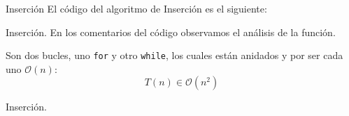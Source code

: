 \documentclass[10pt, xcolor=table]{beamer}
\begin{document}
\begin{frame}{Inserción}
	El código del algoritmo de Inserción es el siguiente:
	
\end{frame}

\begin{frame}[fragile]{Inserción.
		}
	En los comentarios del código observamos el análisis de la función.
	
	Son dos bucles, uno \texttt{for} y otro \texttt{while}, los cuales están anidados y por ser cada uno \(\mathcal{O}(n)\):
	\[
	T(n) \in \mathcal{O}(n^2)
	\]
\end{frame}

\begin{frame}{Inserción.
		}
	\begin{table}[h!]
		\centering
		\footnotesize
		\caption{Experiencia empírica de algoritmo de Inserción sin optimizar}
	\end{table}
\end{frame}
\end{document}
